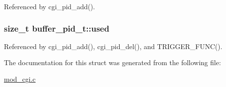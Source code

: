 Referenced by cgi\-\_\-pid\-\_\-add().

\hypertarget{structbuffer__pid__t_a33a6b172db9974830ceb613918712bc8}{
\subsubsection[{used}]{\setlength{\rightskip}{0pt plus 5cm}size\-\_\-t buffer\-\_\-pid\-\_\-t\-::used}}\label{structbuffer__pid__t_a33a6b172db9974830ceb613918712bc8}


Referenced by cgi\-\_\-pid\-\_\-add(), cgi\-\_\-pid\-\_\-del(), and T\-R\-I\-G\-G\-E\-R\-\_\-\-F\-U\-N\-C().



The documentation for this struct was generated from the following file\-:\begin{DoxyCompactItemize}
\item 
\hyperlink{mod__cgi_8c}{mod\-\_\-cgi.\-c}\end{DoxyCompactItemize}
